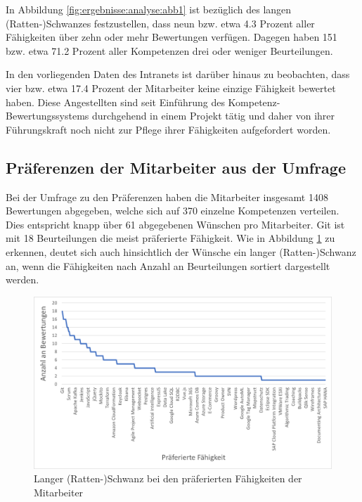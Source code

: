 In Abbildung \ref{fig:ergebnisse:analyse:abb1} ist bezüglich des langen (Ratten-)Schwanzes festzustellen, dass neun bzw. etwa 4.3 Prozent aller Fähigkeiten über zehn oder mehr Bewertungen verfügen. Dagegen haben 151 bzw. etwa 71.2 Prozent aller Kompetenzen drei oder weniger Beurteilungen.

In den vorliegenden Daten des Intranets ist darüber hinaus zu beobachten, dass vier bzw. etwa 17.4 Prozent der Mitarbeiter keine einzige Fähigkeit bewertet haben. Diese Angestellten sind seit Einführung des Kompetenz-Bewertungssystems durchgehend in einem Projekt tätig und daher von ihrer Führungskraft noch nicht zur Pflege ihrer Fähigkeiten aufgefordert worden.

\subsection{Präferenzen der Mitarbeiter aus der Umfrage}
\label{ch:ergebnisse:analyse:praeferenzen}
Bei der Umfrage zu den Präferenzen haben die Mitarbeiter insgesamt 1408 Bewertungen abgegeben, welche sich auf 370 einzelne Kompetenzen verteilen. Dies entspricht knapp über 61 abgegebenen Wünschen pro Mitarbeiter. Git ist mit 18 Beurteilungen die meist präferierte Fähigkeit. Wie in Abbildung \ref{fig:ergebnisse:analyse:abb2} zu erkennen, deutet sich auch hinsichtlich der Wünsche ein langer (Ratten-)Schwanz an, wenn die Fähigkeiten nach Anzahl an Beurteilungen sortiert dargestellt werden.
 
\begin{figure}[h]
	\centering
	\includegraphics[width=1\textwidth]{gfx/long-tail-praeferenzen.png}
	\caption{Langer (Ratten-)Schwanz bei den präferierten Fähigkeiten der Mitarbeiter}
	\label{fig:ergebnisse:analyse:abb2}
\end{figure}


